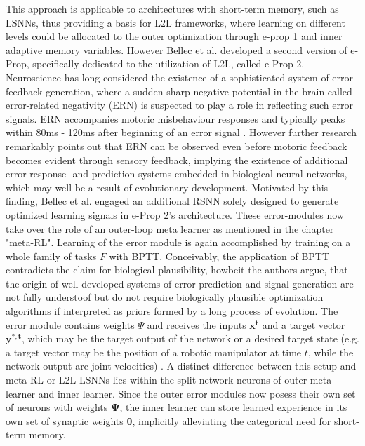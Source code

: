 \documentclass[letterpaper, 10 pt, conference]{ieeeconf}  %
\begin{document}
This approach is applicable to architectures with short-term memory, such as LSNNs, thus providing a basis for L2L frameworks, where 
learning on different levels could be allocated to the outer optimization through e-prop 1 and inner adaptive memory variables. 
\newline
However Bellec et al. developed a second version of e-Prop, specifically dedicated to the utilization of L2L, called e-Prop 2. 
Neuroscience has long considered the existence of a sophisticated system of error feedback generation, where a sudden sharp 
negative potential in the brain called error-related negativity (ERN) is suspected to play a role in reflecting such error signals.
ERN accompanies motoric misbehaviour responses and typically peaks within 80ms - 120ms after beginning of an error signal 
\cite{gehringErrorRelatedNegativity2018}\cite{dikmanErrorMonitoringReward2000}.
However further research remarkably points out that ERN can be observed even before motoric feedback becomes evident through 
sensory feedback, implying the existence of additional error response- and prediction systems embedded in biological neural networks,
\cite{macleanUsingBrainPotentials2015}
which may well be a result of evolutionary development.
Motivated by this finding, Bellec et al.\cite{bellecBiologicallyInspiredAlternatives2019} engaged an additional 
RSNN solely designed to generate optimized learning signals in e-Prop 2's architecture.
These error-modules now take over the role of an outer-loop meta learner as mentioned in the chapter "meta-RL". Learning of the error module 
is again accomplished by training on a whole family of tasks $F$ with BPTT. Conceivably, the application of BPTT contradicts the claim for 
biological plausibility, howbeit the authors argue, that the origin of 
well-developed systems of error-prediction and signal-generation are not fully understoof but do not require biologically plausible optimization 
algorithms if interpreted as priors formed by a long process of evolution. The error module contains weights $\Psi$ and receives the  
inputs $\mathbf{x^t}$ and a target vector $\mathbf{y^{*,t}}$, which may be the target output of the network or a desired target state 
(e.g. a target vector may 
be the position of a robotic manipulator at time $t$, while the network output are joint velocities) \cite{bellecBiologicallyInspiredAlternatives2019}.
A distinct difference 
between this setup and meta-RL or L2L LSNNs lies within the split network neurons of outer meta-learner and inner learner. Since the outer error
modules now posess their own set of neurons with weights $\mathbf{\Psi}$, the inner learner can store learned experience in 
its own set of synaptic weights
$\mathbf{\theta}$, implicitly alleviating the categorical need for short-term memory. \newline
\end{document}
